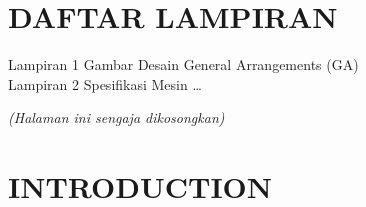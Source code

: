 \documentclass[12pt,a4paper,twoside,openright]{book}
\theoremstyle{definition}
\theoremstyle{plain}
\theoremstyle{remark}
\newcommand{\cleardoublepageblank}{%
  \clearpage
  \ifodd\value{page}\else
    \thispagestyle{empty}
    \vspace*{\fill}
    \vspace*{\fill}
    \clearpage
  \fi
}
\newcommand{\cleardoublepagekosong}{%
  \clearpage
  \ifodd\value{page}\else
    \thispagestyle{empty}
    \vspace*{\fill}
    \begin{center}
      \textit{(Halaman ini sengaja dikosongkan)}
    \end{center}
    \vspace*{\fill}
    \clearpage
  \fi
}
\begin{document}
\cleardoublepageblank



\tableofcontents
\cleardoublepageblank


\listoffigures
\cleardoublepageblank


\listoftables

\chapter*{DAFTAR LAMPIRAN}

\noindent Lampiran 1 \quad Gambar Desain General Arrangements (GA) \\
\noindent Lampiran 2 \quad Spesifikasi Mesin \ldots {}

\cleardoublepagekosong



\mainmatter

\chapter{INTRODUCTION}
\end{document}
